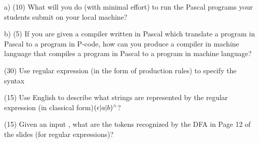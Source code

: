 \documentclass[12pt, letterpaper]{article}
\begin{document}
{a) (10) What will you do (with minimal effort) to run the Pascal programs your students submit on your local machine?

b) (5) If you are given a compiler written in Pascal which translate a program in Pascal to a program in P-code, how can you produce a compiler in machine language that compiles a program in Pascal to a program in machine language? 

  \item (30) Use regular expression (in the form of production rules) to specify the syntax
  \item (15) Use English to describe what strings are represented by the regular expression (in classical form)$(\epsilon | a | b)^\wedge$?

  \item (15) Given an input , what are the tokens recognized by the DFA in Page 12 of the slides (for regular expressions)?
}
\end{document}
